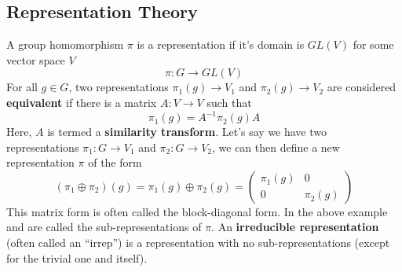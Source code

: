 \subsection{Representation Theory}
A group homomorphism $\pi$ is a representation if it's domain is $GL(V)$ for some vector space $V$ 
\begin{equation}
    \pi: G \rightarrow GL(V)
\end{equation}
For all $g \in G$, two representations $\pi_{1}(g) \rightarrow V_{1}$ and $\pi_{2}(g) \rightarrow V_{2}$ are considered \textbf{equivalent} if there is a matrix $A: V \rightarrow V$ such that
\begin{equation}
    \pi_{1}(g) = A^{-1} \pi_{2}(g) A
\end{equation}
 Here, $A$ is termed a \textbf{similarity transform}. Let's say we have two representations $\pi_{1}: G \rightarrow V_{1}$ and $\pi_{2}: G \rightarrow V_{2}$, we can then define a new representation $\pi$ of the form
\begin{equation}
    (\pi_{1}\oplus\pi_{2})(g) = \pi_{1}(g)\oplus\pi_{2}(g) = \begin{pmatrix}
\pi_{1}(g) & 0 \\
0 & \pi_{2}(g)
\end{pmatrix}
\end{equation}
This matrix form is often called the block-diagonal form. In the above example and are called the sub-representations of $\pi$. An \textbf{irreducible representation} (often called an “irrep”) is a representation with no sub-representations (except for the trivial one and itself).
    
